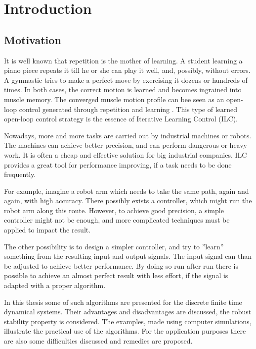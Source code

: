 \chapter{Introduction}

\section{Motivation} 

It is well known that repetition is the mother of learning. A student learning a piano piece repeats it till he or she can play it well, and, possibly, without errors. 
A gymnastic tries to make a perfect move by exercising it dozens or hundreds of times. 
In both cases, the correct motion is learned and becomes ingrained into muscle memory. The converged muscle motion profile can bee seen as an open-loop control generated through repetition and learning \cite{Bristov06}. This type of learned open-loop control strategy is the essence of Iterative Learning Control (ILC). 

Nowadays, more and more tasks are carried out by industrial machines or robots. The machines can achieve better precision, and can perform dangerous or heavy work. It is often a cheap and effective solution for big industrial companies. ILC provides a great tool for performance improving, if a task needs to be done frequently. 

For example, imagine a robot arm which needs to take the same path, again and again, with high accuracy. There possibly exists a controller, which might run the robot arm along this route. However, to achieve good precision, a simple controller might not be enough, and more complicated techniques must be applied to impact the result. 

The other possibility is to design a simpler controller, and try to ''learn'' something from the resulting input and output signals. The input signal can than be adjusted to achieve better performance. By doing so run after run there is possible to achieve an almost perfect result with less effort, if the signal is adapted with a proper algorithm. 

In this thesis some of such algorithms are presented for the discrete finite time dynamical systems. Their advantages and disadvantages are discussed, the robust stability property is considered. The examples, made using computer simulations, illustrate the practical use of the algorithms. For the application purposes there are also some difficulties discussed and remedies are proposed. 

